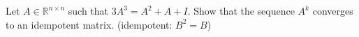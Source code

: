 Let \(A\in\mathbb{R}^{n\times n}\) such that \(3A^3=A^2+A+I\). Show that the sequence \(A^k\) converges to an idempotent matrix. (idempotent: \(B^2=B\))